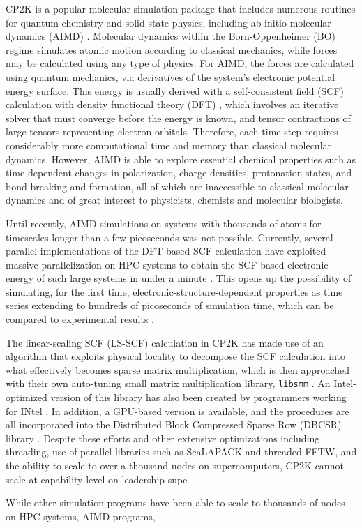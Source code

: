 CP2K \cite{hutter2014cp2k} is a popular molecular simulation package that includes numerous routines for quantum chemistry and solid-state physics, including ab initio molecular dynamics (AIMD) \cite{marx2009ab}. Molecular dynamics within the Born-Oppenheimer (BO) regime simulates atomic motion  according to classical mechanics, while forces may be calculated using any type of physics. For AIMD, the forces are calculated using quantum mechanics, via derivatives of the system's electronic potential energy surface. This energy is usually derived with a self-consistent field (SCF) calculation with density functional theory (DFT) \cite{vandevondele2012linear,hutter2014cp2k}, which involves an iterative solver that must converge before the energy is known, and tensor contractions of large tensors representing electron orbitals. Therefore, each time-step requires considerably more computational time and memory than classical molecular dynamics. However, AIMD is able to explore essential chemical properties such as time-dependent changes in polarization, charge densities, protonation states, and bond breaking and formation, all of which are inaccessible to classical molecular dynamics and of great interest to physicists, chemists and molecular biologists.

Until recently, AIMD simulations on systems with thousands of atoms for timescales longer than a few picoseconds was not possible. Currently, several parallel implementations of the DFT-based SCF calculation have exploited massive parallelization on HPC systems to obtain the SCF-based electronic energy of such large systems in under a minute \cite{vasp_bench,kresse1996efficient,cp2k_bench,vandevondele2012linear}. This opens up the possibility of simulating, for the first time, electronic-structure-dependent properties as time series extending to hundreds of picoseconds of simulation time, which can be compared to experimental results \cite{gillan2016perspective, pestana2017ab, hassanali2013proton, milovanovic2018new, sellner2013charge}.

The linear-scaling SCF (LS-SCF) calculation \cite{vandevondele2012linear} in CP2K has made use of an algorithm that exploits physical locality to decompose the SCF calculation into what effectively becomes sparse matrix multiplication, which is then approached with their own auto-tuning small matrix multiplication library, \texttt{libsmm} \cite{borvstnik2014sparse}. An Intel-optimized version of this library has also been created by programmers working for INtel \cite{heinecke2016libxsmm}. In addition, a GPU-based version is available, and the procedures are all incorporated into the Distributed Block Compressed Sparse Row (DBCSR) library \cite{borvstnik2014sparse,schutt2016gpu}. Despite these efforts and other extensive optimizations including  threading, use of parallel libraries such as ScaLAPACK and threaded FFTW, and the ability to scale to over a thousand nodes on supercomputers, CP2K cannot scale at capability-level on leadership supe

While other simulation programs have been able to scale to thousands of nodes on HPC systems, AIMD programs, 